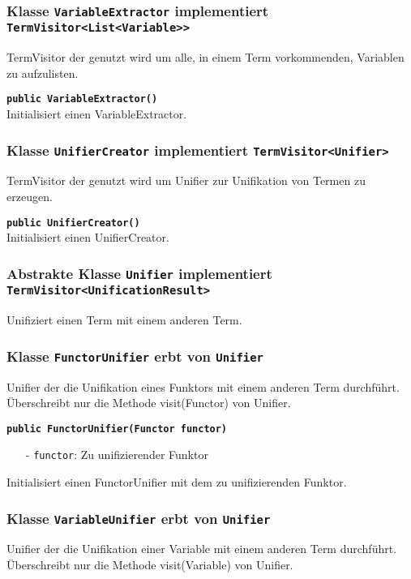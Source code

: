 \documentclass[parskip=full,11pt,twoside]{scrartcl}
\begin{document}
\subsubsection{Klasse \texttt{VariableExtractor} implementiert \texttt{TermVisitor<List<Variable>{}>}}

TermVisitor der genutzt wird um alle, in einem Term vorkommenden, Variablen zu aufzulisten.

\textbf{\texttt{public VariableExtractor()}}\\
Initialisiert einen VariableExtractor.

\subsubsection{Klasse \texttt{UnifierCreator} implementiert \texttt{TermVisitor<Unifier>}}

TermVisitor der genutzt wird um Unifier zur Unifikation von Termen zu erzeugen.

\textbf{\texttt{public UnifierCreator()}}\\
Initialisiert einen UnifierCreator.

\subsubsection{Abstrakte Klasse \texttt{Unifier} implementiert \texttt{TermVisitor<UnificationResult>}}

Unifiziert einen Term mit einem anderen Term.

\subsubsection{Klasse \texttt{FunctorUnifier} erbt von \texttt{Unifier}}
Unifier der die Unifikation eines Funktors mit einem anderen Term durchführt. Überschreibt nur die Methode visit(Functor) von Unifier.

\textbf{\texttt{public FunctorUnifier(Functor functor)}}
\begin{itemize}[noitemsep]
	\item[-] \texttt{functor}: Zu unifizierender Funktor
\end{itemize}
Initialisiert einen FunctorUnifier mit dem zu unifizierenden Funktor.

\subsubsection{Klasse \texttt{VariableUnifier} erbt von \texttt{Unifier}}
Unifier der die Unifikation einer Variable mit einem anderen Term durchführt. Überschreibt nur die Methode visit(Variable) von Unifier.
\end{document}
